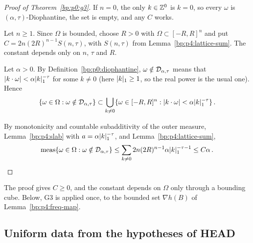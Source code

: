 \begin{proof}[Proof of Theorem~\ref{bp:p0:g3}]
\label{step:p4:g3-n0}
If $n=0$, the only $k\in\mathbb{Z}^0$ is $k=0$, so every $\omega$ is $(\alpha,\tau)$-Diophantine, the set
is empty, and any $C$ works.

\label{step:p4:g3-cube}
Let $n\ge1$. Since $\Omega$ is bounded, choose $R>0$ with $\Omega\subset[-R,R]^n$ and put
$C=2n(2R)^{n-1}S(n,\tau)$, with $S(n,\tau)$ from Lemma~\ref{bp:p4:lattice-sum}. The constant
depends only on $n$, $\tau$ and $R$.

\label{step:p4:g3-union}
Let $\alpha>0$. By Definition~\ref{bp:p0:diophantine}, $\omega\notin\mathcal{D}_{\alpha,\tau}$ means that
$\lvert k\cdot\omega\rvert<\alpha\lvert k\rvert_1^{-\tau}$ for some $k\ne0$ (here $\lvert k\rvert_1\ge1$, so the real
power is the usual one). Hence
\begin{equation*}
\{\omega\in\Omega:\omega\notin\mathcal{D}_{\alpha,\tau}\}\subset\bigcup_{k\ne0}\{\omega\in[-R,R]^n:\lvert k\cdot\omega\rvert<\alpha\lvert k\rvert_1^{-\tau}\}\,.
\end{equation*}

\label{step:p4:g3-sum}
By monotonicity and countable subadditivity of the outer measure, Lemma~\ref{bp:p4:slab} with
$a=\alpha\lvert k\rvert_1^{-\tau}$, and Lemma~\ref{bp:p4:lattice-sum},
\begin{equation*}
\operatorname{meas}\{\omega\in\Omega:\omega\notin\mathcal{D}_{\alpha,\tau}\}\le\sum_{k\ne0}2n(2R)^{n-1}\alpha\lvert k\rvert_1^{-\tau-1}\le C\alpha\,.
\end{equation*}
\end{proof}

\begin{remark}\label{bp:p4:g3-remark}
The proof gives $C\ge0$, and the constant depends on $\Omega$ only through a bounding cube. Below, G3 is applied once, to the bounded set $\nabla h(B)$ of
Lemma~\ref{bp:p4:freq-map}.
\end{remark}

\subsection{Uniform data from the hypotheses of HEAD}\label{bp:p4:sec-data}

